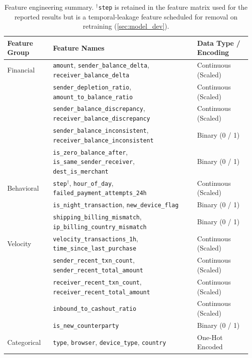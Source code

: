\begin{table}[htbp]
\centering
\footnotesize
\setlength{\tabcolsep}{6pt}
\renewcommand{\arraystretch}{1.2}
\caption{Feature engineering summary. $^{\dagger}$\texttt{step} is retained in the feature matrix used for the reported results but is a temporal-leakage feature scheduled for removal on retraining (\cref{sec:model_dev}).}
\label{tab:features_summary}
\begin{tabularx}{\textwidth}{@{}l >{\raggedright\arraybackslash}X l@{}}
\toprule
\textbf{Feature Group} & \textbf{Feature Names} & \textbf{Data Type / Encoding} \\
\midrule
Financial & \texttt{amount}, \texttt{sender\_balance\_delta}, \texttt{receiver\_balance\_delta} & Continuous (Scaled) \\
          & \texttt{sender\_depletion\_ratio}, \texttt{amount\_to\_balance\_ratio} & Continuous (Scaled) \\
          & \texttt{sender\_balance\_discrepancy}, \texttt{receiver\_balance\_discrepancy} & Continuous (Scaled) \\
          & \texttt{sender\_balance\_inconsistent}, \texttt{receiver\_balance\_inconsistent} & Binary (0 / 1) \\
          & \texttt{is\_zero\_balance\_after}, \texttt{is\_same\_sender\_receiver}, \texttt{dest\_is\_merchant} & Binary (0 / 1) \\
\midrule
Behavioral & \texttt{step}$^{\dagger}$, \texttt{hour\_of\_day}, \texttt{failed\_payment\_attempts\_24h} & Continuous (Scaled) \\
           & \texttt{is\_night\_transaction}, \texttt{new\_device\_flag} & Binary (0 / 1) \\
           & \texttt{shipping\_billing\_mismatch}, \texttt{ip\_billing\_country\_mismatch} & Binary (0 / 1) \\
\midrule
Velocity & \texttt{velocity\_transactions\_1h}, \texttt{time\_since\_last\_purchase} & Continuous (Scaled) \\
         & \texttt{sender\_recent\_txn\_count}, \texttt{sender\_recent\_total\_amount} & Continuous (Scaled) \\
         & \texttt{receiver\_recent\_txn\_count}, \texttt{receiver\_recent\_total\_amount} & Continuous (Scaled) \\
         & \texttt{inbound\_to\_cashout\_ratio} & Continuous (Scaled) \\
         & \texttt{is\_new\_counterparty} & Binary (0 / 1) \\
\midrule
Categorical & \texttt{type}, \texttt{browser}, \texttt{device\_type}, \texttt{country} & One-Hot Encoded \\
\bottomrule
\end{tabularx}
\end{table}


